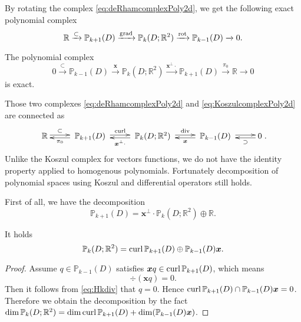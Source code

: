 By rotating the complex \eqref{eq:deRhamcomplexPoly2d}, we get the following exact polynomial complex
\begin{equation*}
\mathbb R\xrightarrow{\subset} \mathbb P_{k+1}(D)\xrightarrow{\operatorname{grad}} \mathbb P_k(D;\mathbb R^2) \xrightarrow{\operatorname*{rot}} \mathbb P_{k-1}(D)\xrightarrow{}0.
\end{equation*}


\begin{lemma}
The polynomial complex
\begin{equation}\label{eq:KoszulcomplexPoly2d}
0\xrightarrow{\subset}\mathbb P_{k-1}(D) \xrightarrow{\boldsymbol x} \mathbb P_k(D;\mathbb R^2) \xrightarrow{\boldsymbol x^{\perp}\cdot} \mathbb P_{k+1}(D)\xrightarrow{\pi_{0}}\mathbb R\xrightarrow{}0
\end{equation}
is exact.
\end{lemma}

Those two complexes \eqref{eq:deRhamcomplexPoly2d} and \eqref{eq:KoszulcomplexPoly2d} are connected as
\begin{equation}\label{eq:deRhamcomplexPolydouble2d}
\xymatrix{
\mathbb R\ar@<0.4ex>[r]^-{\subset} & \; \mathbb P_{k+1}(D)\; \ar@<0.4ex>[r]^-{\curl}\ar@<0.4ex>[l]^-{\pi_0}  & \; \mathbb P_k(D;\mathbb R^2) \ar@<0.4ex>[r]^-{\div}\; \ar@<0.4ex>[l]^-{\boldsymbol x^{\bot}\cdot} & \; \mathbb P_{k-1}(D)  \; \ar@<0.4ex>[r]^-{} \ar@<0.4ex>[l]^-{\boldsymbol x}
& 0 \ar@<0.4ex>[l]^-{\supset} }.
\end{equation}
Unlike the Koszul complex for vectors functions, we do not have the identity property applied to homogenous polynomials. Fortunately decomposition of polynomial spaces using Koszul and differential operators still holds.

First of all, we have the decomposition
\[
\mathbb P_{k+1}(D) = \boldsymbol x^{\perp}\cdot\mathbb P_k(D;\mathbb R^2)\oplus\mathbb R.
\]

\begin{lemma}\label{lem:symmpolyspacedirectsum}
It holds
 \begin{equation}\label{eq:vector2polyspacedecomp2}
\mathbb P_{k}(D;\mathbb R^2)=\operatorname{curl}\mathbb P_{k+1}(D)\oplus\mathbb P_{k-1}(D)\boldsymbol x.
\end{equation}
\end{lemma}
\begin{proof}
Assume $q\in\mathbb P_{k-1}(D)$ satisfies $\boldsymbol xq\in\operatorname{curl}\mathbb P_{k+1}(D)$, which means
\[
\div(\boldsymbol  xq)=0.
\]
Then it follows from \eqref{eq:Hkdiv} that
$q=0$.
Hence $\operatorname{curl}\mathbb P_{k+1}(D)\cap\mathbb P_{k-1}(D)\boldsymbol x=0$.
Therefore we obtain the decomposition by the fact $\dim\mathbb P_{k}(D;\mathbb R^2)=\dim\operatorname{curl}\mathbb P_{k+1}(D)+\dim(\mathbb P_{k-1}(D)\boldsymbol x)$.
\end{proof}

